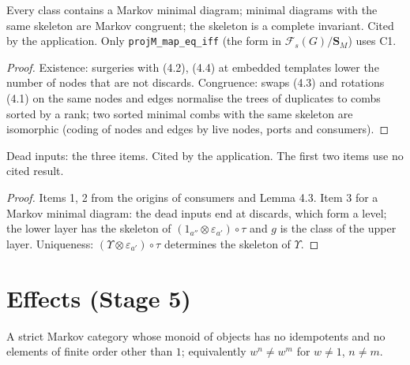 \begin{lemma}[Lemma 4.4]
\label{lem:4.4}
\leanok
{}
Every class contains a Markov minimal diagram; minimal diagrams with the same
skeleton are Markov congruent; the skeleton is a complete invariant. Cited by
the application. Only \texttt{projM\_map\_eq\_iff} (the form in
$\mathcal F_s(G)/\mathbf S_M$) uses C1.
\end{lemma}
\begin{proof}
\leanok
Existence: surgeries with (4.2), (4.4) at embedded templates lower the number of nodes
that are not discards. Congruence: swaps (4.3) and rotations (4.1) on the same nodes and
edges normalise the trees of duplicates to combs sorted by a rank; two sorted minimal
combs with the same skeleton are isomorphic (coding of nodes and edges by live nodes,
ports and consumers).
\end{proof}

\begin{lemma}[Lemma 4.5]
\label{lem:4.5}
\leanok
{}
Dead inputs: the three items. Cited by the application. The first two items use no cited result.
\end{lemma}
\begin{proof}
\leanok
Items 1, 2 from the origins of consumers and Lemma 4.3. Item 3 for a Markov minimal
diagram: the dead inputs end at discards, which form a level; the lower layer has the
skeleton of $(1_{a''} \otimes \varepsilon_{a'}) \circ \tau$ and $g$ is the class of the
upper layer. Uniqueness: $(\Upsilon \otimes \varepsilon_{a'}) \circ \tau$ determines the
skeleton of $\Upsilon$.
\end{proof}

\section{Effects (Stage 5)}

\begin{definition}
\label{def:5.straight}
\leanok
{}
A strict Markov category whose monoid of objects has no idempotents and no elements of
finite order other than $1$; equivalently $w^n \neq w^m$ for $w \neq 1$, $n \neq m$.
\end{definition}

